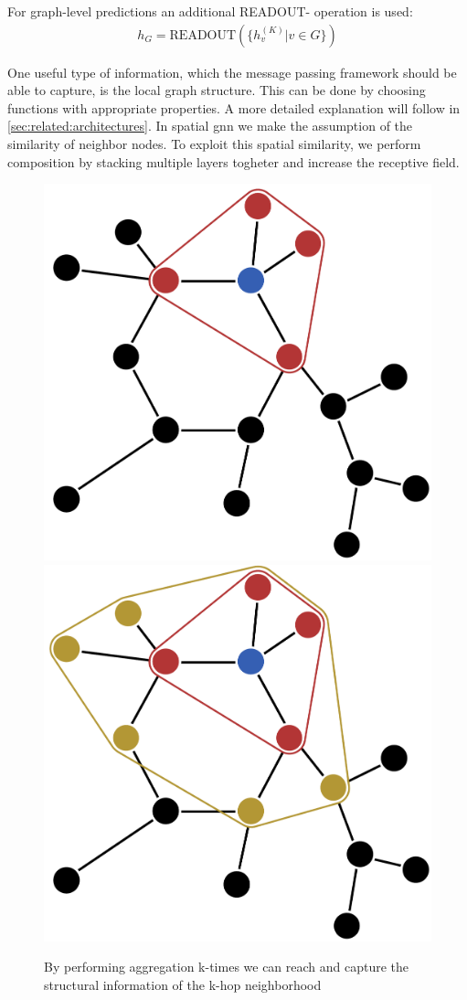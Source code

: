 For graph-level predictions an additional READOUT- operation is used:
\begin{align*}
    h_{G} =\mathrm{READOUT}(\{h_{v}^{(K)}| v \in G\})
\end{align*}

One useful type of information, which the message passing framework should be able to
capture, is the local graph structure. This can be done by choosing functions with
appropriate properties. A more detailed explanation will follow in
\cref{sec:related:architectures}. In spatial \ac{gnn} we make the assumption of the
similarity of neighbor nodes. To exploit this spatial similarity, we perform
composition by stacking multiple layers togheter and increase the receptive field.

\begin{figure}[ht]
    \centering
    \includegraphics[width=0.35\linewidth]{gfx/related-work/1hop}\hspace{1cm}
    \includegraphics[width=0.35\linewidth]{gfx/related-work/2hop}
    \caption{By performing aggregation k-times we can reach and capture the
        structural information of the k-hop neighborhood}\label{fig:related:1hop}
\end{figure}


